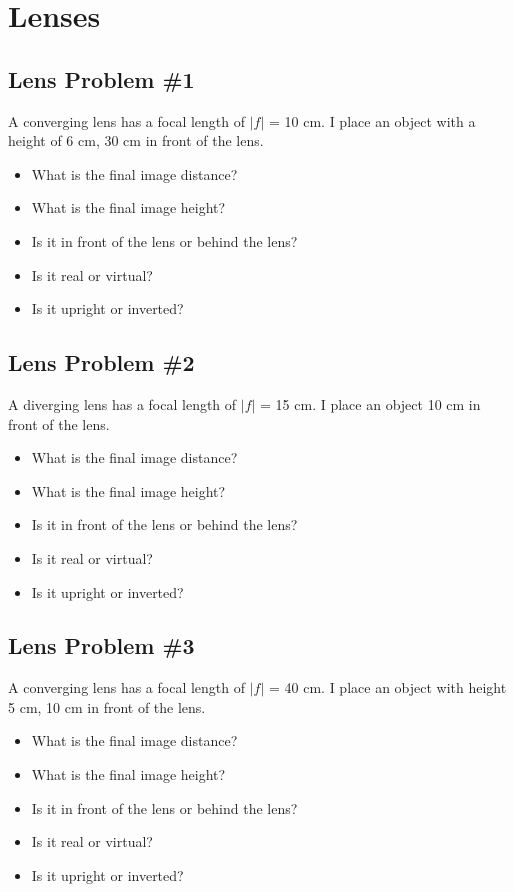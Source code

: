 \documentclass[11pt]{article}
\begin{document}
\pagebreak
\section{Lenses}

\subsection{Lens Problem \#1}
A converging lens has a focal length of $|f|$ = 10 cm.  I place an object with a height of 6 cm, 30 cm in front of the lens.  

\begin{itemize}
\item What is the final image distance?
\item What is the final image height?
\item Is it in front of the lens or behind the lens?  
\item Is it real or virtual?
\item Is it upright or inverted?
\end{itemize}

\subsection{Lens Problem \#2}
A diverging lens has a focal length of $|f|$ = 15 cm.  I place an object 10 cm in front of the lens.  

\begin{itemize}
\item What is the final image distance?
\item What is the final image height?
\item Is it in front of the lens or behind the lens?  
\item Is it real or virtual?
\item Is it upright or inverted?
\end{itemize}

\subsection{Lens Problem \#3}
A converging lens has a focal length of $|f|$ = 40 cm.  I place an object with height 5 cm, 10 cm in front of the lens. 

\begin{itemize}
\item What is the final image distance?
\item What is the final image height?
\item Is it in front of the lens or behind the lens?  
\item Is it real or virtual?
\item Is it upright or inverted?
\end{itemize}
\end{document}
